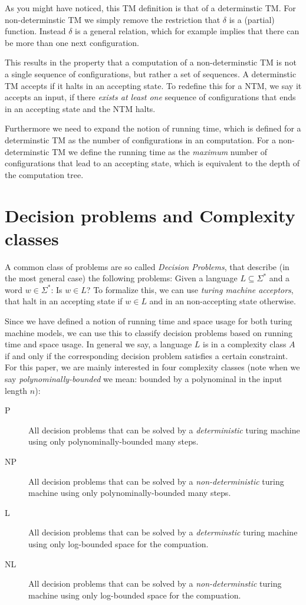 As you might have noticed, this TM definition is that of a determinstic
TM. For non-determinstic TM we simply remove the restriction that
$\delta$ is a (partial) function. Instead $\delta$ is a general
relation, which for example implies that there can be more than one next
configuration.

This results in the property that a computation of a non-determinstic TM
is not a single sequence of configurations, but rather a set of
sequences. A determinstic TM accepts if it halts in an accepting state.
To redefine this for a NTM, we say it accepts an input, if there
\emph{exists at least one} sequence of configurations that ends in an
accepting state and the NTM halts.

Furthermore we need to expand the notion of running time, which is
defined for a determinstic TM as the number of configurations in an
computation. For a non-determinstic TM we define the running time as the
\emph{maximum} number of configurations that lead to an accepting state,
which is equivalent to the depth of the computation tree.

\section{Decision problems and Complexity
classes}\label{decision-problems-and-complexity-classes}

A common class of problems are so called \emph{Decision Problems}, that
describe (in the most general case) the following problems: Given a
language $L \subseteq \Sigma^*$ and a word $w \in \Sigma^*$: Is
$w \in L$? To formalize this, we can use \emph{turing machine
acceptors}, that halt in an accepting state if $w \in L$ and in an
non-accepting state otherwise.

Since we have defined a notion of running time and space usage for both
turing machine models, we can use this to classify decision problems
based on running time and space usage. In general we say, a language $L$
is in a complexity class $A$ if and only if the corresponding decision
problem satisfies a certain constraint. For this paper, we are mainly
interested in four complexity classes (note when we say
\emph{polynominally-bounded} we mean: bounded by a polynominal in the
input length $n$):

\begin{description}
\item[P]
All decision problems that can be solved by a \emph{deterministic}
turing machine using only polynominally-bounded many steps.
\item[NP]
All decision problems that can be solved by a \emph{non-deterministic}
turing machine using only polynominally-bounded many steps.
\item[L]
All decision problems that can be solved by a \emph{determinstic} turing
machine using only log-bounded space for the compuation.
\item[NL]
All decision problems that can be solved by a \emph{non-determinstic}
turing machine using only log-bounded space for the compuation.
\end{description}

